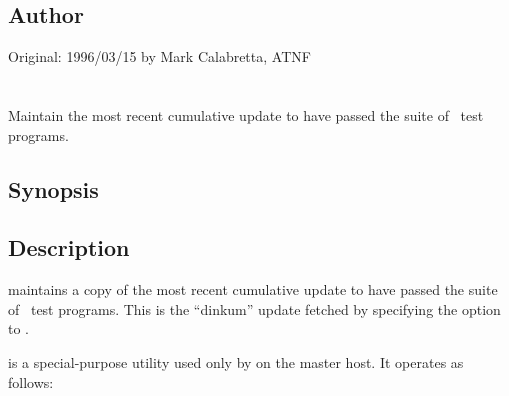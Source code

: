 \subsection*{Author}
 
Original: 1996/03/15 by Mark Calabretta, ATNF

 
\newpage
\section{}
\label{testsuite}



Maintain the most recent cumulative update to have passed the suite of
\aipspp\ test programs.

\subsection*{Synopsis}
 
\begin{synopsis}
\end{synopsis}
 
\subsection*{Description}
 
 maintains a copy of the most recent cumulative update
to have passed the suite of \aipspp\ test programs.  This is the ``dinkum''
update fetched by specifying the  option to .

 is a special-purpose utility used only by  on
the master host.  It operates as follows:


